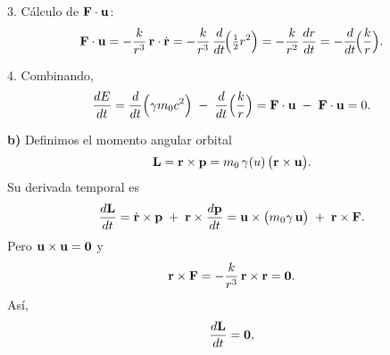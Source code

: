 \documentclass{article}
\begin{document}
3. Cálculo de \(\vb F\cdot\vb u\):
\[
\vb F\cdot\vb u
= -\frac{k}{r^3}\,\vb r\cdot\dot{\vb r}
= -\frac{k}{r^3}\,\frac{d}{dt}\!\Bigl(\tfrac12 r^2\Bigr)
= -\frac{k}{r^2}\,\frac{dr}{dt}
= -\frac{d}{dt}\!\Bigl(\frac{k}{r}\Bigr).
\]

4. Combinando,
\[
\frac{dE}{dt}
= \frac{d}{dt}\Bigl(\gamma m_0 c^2\Bigr)
  \;-\;\frac{d}{dt}\Bigl(\frac{k}{r}\Bigr)
= \vb F\cdot\vb u \;-\;\vb F\cdot\vb u
= 0.
\]



\textbf{b) } Definimos el momento angular orbital
\[
\vb L = \vb r \times \vb p
= m_0\,\gamma(u)\,\bigl(\vb r\times\vb u\bigr).
\]
Su derivada temporal es
\[
\frac{d\vb L}{dt}
= \dot{\vb r}\times\vb p \;+\;\vb r\times\frac{d\vb p}{dt}
= \vb u\times\bigl(m_0\gamma\,\vb u\bigr)
  \;+\;\vb r\times\vb F.
\]
Pero \(\vb u\times\vb u = \vb 0\) y
\[
\vb r\times\vb F
= -\frac{k}{r^3}\,\vb r\times\vb r
= \vb 0.
\]
Así,
\[
\frac{d\vb L}{dt} = \vb 0,
\]








\setcounter{section}{8}
\section{}
\end{document}
